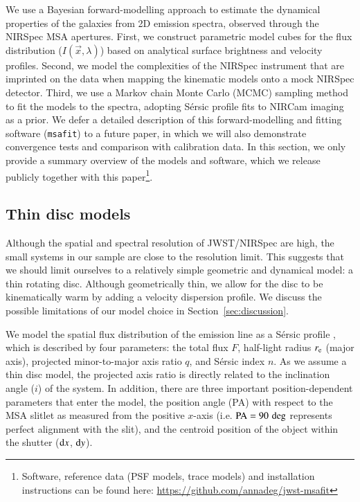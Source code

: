 \documentclass[longauth]{aa}
\newcommand{\re}{r_{\rm e}}
\begin{document}
We use a Bayesian forward-modelling approach to estimate the dynamical properties of the galaxies from 2D emission spectra, observed through the NIRSpec MSA apertures. First, we construct parametric model cubes for the flux distribution ($I(\vec{x},\lambda)$) based on analytical surface brightness and velocity profiles. Second, we model the complexities of the NIRSpec instrument that are imprinted on the data when mapping the kinematic models onto a mock NIRSpec detector. Third, we use a Markov chain Monte Carlo (MCMC) sampling method to fit the models to the spectra, adopting S\'ersic profile fits to NIRCam imaging as a prior. We defer a detailed description of this forward-modelling and fitting software (\texttt{msafit}) to a future paper, in which we will also demonstrate convergence tests and comparison with calibration data. In this section, we only provide a summary overview of the models and software, which we release publicly together with this paper\footnote{Software, reference data (PSF models, trace models) and installation instructions can be found here: \url{https://github.com/annadeg/jwst-msafit}}.


\subsection{Thin disc models}\label{sec:model_description}

Although the spatial and spectral resolution of JWST/NIRSpec are high, the small systems in our sample are close to the resolution limit. This suggests that we should limit ourselves to a relatively simple geometric and dynamical model: a thin rotating disc. Although geometrically thin, we allow for the disc to be kinematically warm by adding a velocity dispersion profile. We discuss the possible limitations of our model choice in Section~\ref{sec:discussion}.

We model the spatial flux distribution of the emission line as a S\'ersic profile \citep{Sersic1968}, 
which is described by four parameters: the total flux $F$, half-light radius $\re$ (major axis), projected minor-to-major axis ratio $q$, and S\'ersic index $n$. As we assume a thin disc model, the projected axis ratio is directly related to the inclination angle ($i$) of the system. In addition, there are three important position-dependent parameters that enter the model, the position angle (PA) with respect to the MSA slitlet as measured from the positive $x$-axis (i.e. $\rm PA=90\,\deg$ represents perfect alignment with the slit), and the centroid position of the object within the shutter (${\rm d}x$, ${\rm d}y$). 
\end{document}

